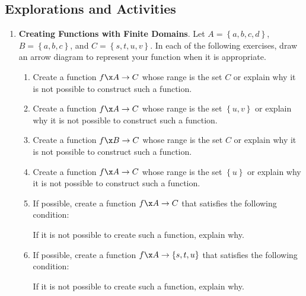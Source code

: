 \subsection*{Explorations and Activities}
\setcounter{oldenumi}{\theenumi}
\begin{enumerate} \setcounter{enumi}{\theoldenumi}
  \item \textbf{Creating Functions with Finite Domains}. Let  $A = \left\{ {a,b,c,d} \right\}$, $B = \left\{ {a,b,c} \right\}$, and  
$C = \left\{ {s,t,u,v} \right\}$.  In each of the following exercises, draw an arrow diagram to represent your function when it is appropriate.
\begin{enumerate}
\item Create a function  $f\x A \to C$ whose range is the set   $C$  or explain why it is not possible to construct such a function.

\item Create a function  $f\x A \to C$ whose range is the set  $\left\{ {u, v} \right\}$ or explain why it is not possible to construct such a function.

\item Create a function  $f\x B \to C$ whose range is the set   $C$  or explain why it is not possible to construct such a function.

\item Create a function  $f\x A \to C$ whose range is the set  $\left\{ u \right\}$ or explain why it is not possible to construct such a function.

\item If possible, create a function  $f\x A \to C$  that satisfies the following condition:
If it is not possible to create such a function, explain why.

\item If possible, create a function  $f\x A \to \left\{ {s, t, u} \right\}$ that satisfies the following condition:


If it is not possible to create such a function, explain why.
\end{enumerate}





\end{enumerate}
